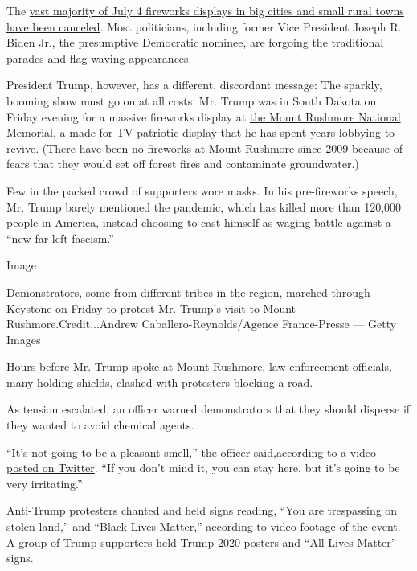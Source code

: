 The
\href{https://www.nytimes3xbfgragh.onion/2020/07/01/business/fourth-of-july-fireworks-displays.html}{vast
majority of July 4 fireworks displays in big cities and small rural
towns have been canceled}. Most politicians, including former Vice
President Joseph R. Biden Jr., the presumptive Democratic nominee, are
forgoing the traditional parades and flag-waving appearances.

President Trump, however, has a different, discordant message: The
sparkly, booming show must go on at all costs. Mr. Trump was in South
Dakota on Friday evening for a massive fireworks display at
\href{http://www.nytimes3xbfgragh.onion/2020/07/01/us/mount-rushmore.html}{the
Mount Rushmore National Memorial}, a made-for-TV patriotic display that
he has spent years lobbying to revive. (There have been no fireworks at
Mount Rushmore since 2009 because of fears that they would set off
forest fires and contaminate groundwater.)

Few in the packed crowd of supporters wore masks. In his pre-fireworks
speech, Mr. Trump barely mentioned the pandemic, which has killed more
than 120,000 people in America, instead choosing to cast himself as
\href{https://www.nytimes3xbfgragh.onion/2020/07/03/us/politics/trump-coronavirus-mount-rushmore.html}{waging
battle against a ``new far-left fascism.''}

Image

Demonstrators, some from different tribes in the region, marched through
Keystone on Friday to protest Mr. Trump's visit to Mount
Rushmore.Credit...Andrew Caballero-Reynolds/Agence France-Presse ---
Getty Images

Hours before Mr. Trump spoke at Mount Rushmore, law enforcement
officials, many holding shields, clashed with protesters blocking a
road.

As tension escalated, an officer warned demonstrators that they should
disperse if they wanted to avoid chemical agents.

``It's not going to be a pleasant smell,'' the officer
said,\href{https://twitter.com/EEBormett/status/1279196853452656641}{according
to a video posted on Twitter}. ``If you don't mind it, you can stay
here, but it's going to be very irritating.''

Anti-Trump protesters chanted and held signs reading, ``You are
trespassing on stolen land,'' and ``Black Lives Matter,'' according to
\href{https://www.pscp.tv/w/1BRKjYOAEMpxw}{video footage of the event}.
A group of Trump supporters held Trump 2020 posters and ``All Lives
Matter'' signs.

